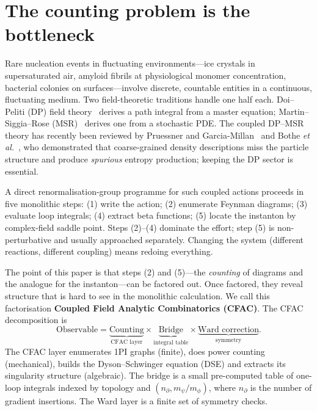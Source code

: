 \documentclass[11pt,a4paper]{article}
\theoremstyle{plain}
\begin{document}
\section{The counting problem is the bottleneck}

Rare nucleation events in fluctuating environments---ice crystals
in supersaturated air, amyloid fibrils at physiological monomer
concentration, bacterial colonies on surfaces---involve discrete,
countable entities in a continuous, fluctuating medium.  Two
field-theoretic traditions handle one half each.  Doi--Peliti
(DP) field theory~\cite{Doi1976,Peliti1985} derives a path
integral from a master equation; Martin--Siggia--Rose
(MSR)~\cite{MSR1973,Janssen1976,DeDominicis1976} derives one from
a stochastic PDE.  The coupled DP--MSR theory has recently been
reviewed by Pruessner and Garcia-Millan~\cite{PruessnerGarciaMillan2025}
and Bothe \textit{et al.}~\cite{Bothe2023}, who demonstrated that
coarse-grained density descriptions miss the particle structure
and produce \emph{spurious} entropy production; keeping the DP
sector is essential.

A direct renormalisation-group programme for such coupled actions
proceeds in five monolithic steps: (1) write the action; (2)
enumerate Feynman diagrams; (3) evaluate loop integrals; (4)
extract beta functions; (5) locate the instanton by complex-field
saddle point.  Steps (2)--(4) dominate the effort; step (5) is
non-perturbative and usually approached separately.  Changing
the system (different reactions, different coupling) means
redoing everything.

The point of this paper is that steps (2) and (5)---the
\emph{counting} of diagrams and the analogue for the
instanton---can be factored out.  Once factored, they reveal
structure that is hard to see in the monolithic calculation.  We
call this factorisation \textbf{Coupled Field Analytic
Combinatorics (CFAC)}.  The CFAC decomposition is
\begin{equation}\label{eq:decomposition}
  \text{Observable}
  = \underbrace{\text{Counting}}_{\text{CFAC layer}}
  \times \underbrace{\text{Bridge}}_{\text{integral table}}
  \times \underbrace{\text{Ward correction}}_{\text{symmetry}}.
\end{equation}
The CFAC layer enumerates 1PI graphs (finite), does power counting
(mechanical), builds the Dyson--Schwinger equation (DSE) and
extracts its singularity structure (algebraic).  The bridge is a
small pre-computed table of one-loop integrals indexed by topology
and $(n_\partial, m_\psi/m_\phi)$, where $n_\partial$ is the
number of gradient insertions.  The Ward layer is a finite set of
symmetry checks.
\end{document}
